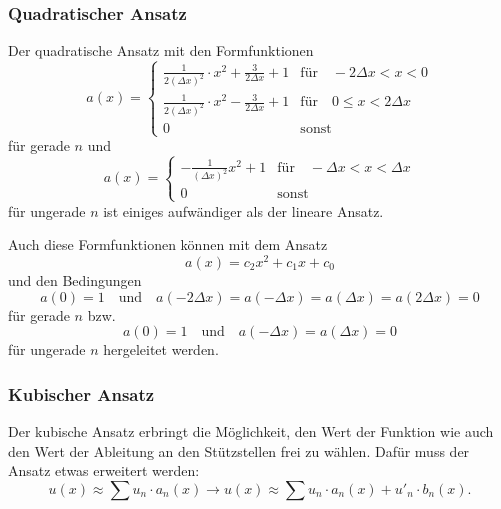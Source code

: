 \subsubsection{Quadratischer Ansatz}
Der quadratische Ansatz mit den Formfunktionen
\begin{equation}
    a(x) = \left\{ \begin{array}{ll}
        \frac{1}{2(\Delta x)^2} \cdot x^2 + \frac{3}{2 \Delta x} + 1  & \text{für} \quad -2 \Delta x < x < 0 \\
        \frac{1}{2(\Delta x)^2} \cdot x^2 - \frac{3}{2 \Delta x} + 1 & \text{für} \quad 0 \leq x < 2 \Delta x \\
        0                                                             & \text{sonst}
    \end{array} \right.
\end{equation}
für gerade $n$ und
\begin{equation}
    a(x) = \left\{ \begin{array}{ll}
        -\frac{1}{(\Delta x)^2} x^2 + 1 & \text{für} \quad -\Delta x < x < \Delta x \\
        0            & \text{sonst}
    \end{array} \right.
\end{equation}
für ungerade $n$ ist einiges aufwändiger als der lineare Ansatz.

Auch diese Formfunktionen können mit dem Ansatz 
\begin{equation}
    a(x) = c_2x^2 + c_1x + c_0
\end{equation}
und den Bedingungen 
\begin{equation}
        a(0) = 1 \quad
        \text{und} \quad 
        a(-2 \Delta x) = a(-\Delta x) = a(\Delta x) = a(2 \Delta x) = 0
\end{equation}
für gerade $n$ bzw.
\begin{equation}
        a(0) = 1 \quad
        \text{und} \quad
        a(-\Delta x) = a(\Delta x) = 0
\end{equation}
für ungerade $n$ hergeleitet werden.

\subsubsection{Kubischer Ansatz}
Der kubische Ansatz erbringt die Möglichkeit, den Wert der Funktion wie auch den Wert der Ableitung an den Stützstellen frei zu wählen.
Dafür muss der Ansatz etwas erweitert werden:
\begin{equation}
    u(x) \approx \sum{u_n \cdot a_n(x)} \rightarrow u(x) \approx \sum{u_n \cdot a_n(x) + u'_n \cdot b_n(x)}.
\end{equation}

